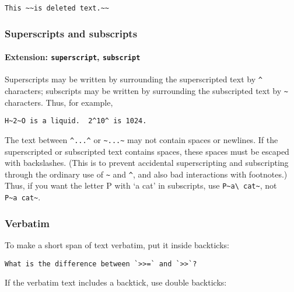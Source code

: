 \documentclass[]{article}
\begin{document}
\begin{verbatim}
This ~~is deleted text.~~
\end{verbatim}

\hypertarget{superscripts-and-subscripts}{%
\subsubsection{Superscripts and
subscripts}\label{superscripts-and-subscripts}}

\hypertarget{extension-superscript-subscript}{%
\paragraph{\texorpdfstring{Extension: \texttt{superscript},
\texttt{subscript}}{Extension: superscript, subscript}}\label{extension-superscript-subscript}}

Superscripts may be written by surrounding the superscripted text by
\texttt{\^{}} characters; subscripts may be written by surrounding the
subscripted text by \texttt{\textasciitilde{}} characters. Thus, for
example,

\begin{verbatim}
H~2~O is a liquid.  2^10^ is 1024.
\end{verbatim}

The text between \texttt{\^{}...\^{}} or
\texttt{\textasciitilde{}...\textasciitilde{}} may not contain spaces or
newlines. If the superscripted or subscripted text contains spaces,
these spaces must be escaped with backslashes. (This is to prevent
accidental superscripting and subscripting through the ordinary use of
\texttt{\textasciitilde{}} and \texttt{\^{}}, and also bad interactions
with footnotes.) Thus, if you want the letter P with `a cat' in
subscripts, use
\texttt{P\textasciitilde{}a\textbackslash{}\ cat\textasciitilde{}}, not
\texttt{P\textasciitilde{}a\ cat\textasciitilde{}}.

\hypertarget{verbatim}{%
\subsubsection{Verbatim}\label{verbatim}}

To make a short span of text verbatim, put it inside backticks:

\begin{verbatim}
What is the difference between `>>=` and `>>`?
\end{verbatim}

If the verbatim text includes a backtick, use double backticks:
\end{document}
